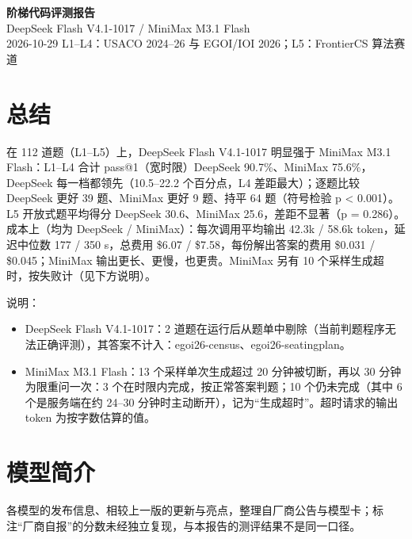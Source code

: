 \documentclass[11pt,a4paper,fontset=none]{ctexart}
\begin{document}
\begin{center}
{\LARGE\bfseries 阶梯代码评测报告}\\[0.5em]
{\Large DeepSeek Flash V4.1-1017 / MiniMax M3.1 Flash}\\[0.4em]
{\small 2026-10-29 \quad L1--L4：USACO 2024--26 与 EGOI/IOI 2026；L5：FrontierCS 算法赛道}
\end{center}
\section{总结}
在 112 道题（L1–L5）上，DeepSeek Flash V4.1-1017 明显强于 MiniMax M3.1 Flash：L1–L4 合计 pass@1（宽时限）DeepSeek 90.7\%、MiniMax 75.6\%，DeepSeek 每一档都领先（10.5–22.2 个百分点，L4 差距最大）；逐题比较 DeepSeek 更好 39 题、MiniMax 更好 9 题、持平 64 题（符号检验 p < 0.001）。L5 开放式题平均得分 DeepSeek 30.6、MiniMax 25.6，差距不显著（p = 0.286）。成本上（均为 DeepSeek / MiniMax）：每次调用平均输出 42.3k / 58.6k token，延迟中位数 177 / 350 s，总费用 \$6.07 / \$7.58，每份解出答案的费用 \$0.031 / \$0.045；MiniMax 输出更长、更慢，也更贵。MiniMax 另有 10 个采样生成超时，按失败计（见下方说明）。
\par 说明：
\begin{itemize}
\item DeepSeek Flash V4.1-1017：2 道题在运行后从题单中剔除（当前判题程序无法正确评测），其答案不计入：egoi26-census、egoi26-seatingplan。
\item MiniMax M3.1 Flash：13 个采样单次生成超过 20 分钟被切断，再以 30 分钟为限重问一次：3 个在时限内完成，按正常答案判题；10 个仍未完成（其中 6 个是服务端在约 24–30 分钟时主动断开），记为“生成超时”。超时请求的输出 token 为按字数估算的值。
\end{itemize}
\section{模型简介}
各模型的发布信息、相较上一版的更新与亮点，整理自厂商公告与模型卡；标注“厂商自报”的分数未经独立复现，与本报告的测评结果不是同一口径。
\end{document}
